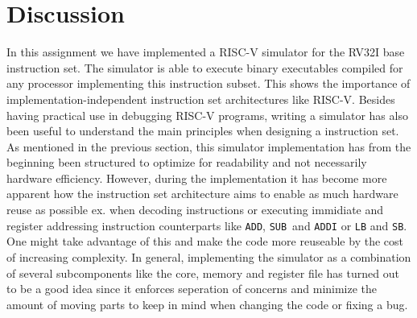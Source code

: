 \documentclass{article}
\begin{document}
\section{Discussion}
In this assignment we have implemented a RISC-V simulator for the RV32I base instruction set. The simulator is able to execute binary executables compiled for any processor implementing this instruction subset. This shows the importance of implementation-independent instruction set architectures like RISC-V. Besides having practical use in debugging RISC-V programs, writing a simulator has also been useful to understand the main principles when designing a instruction set. As mentioned in the previous section, this simulator implementation has from the beginning been structured to optimize for readability and not necessarily hardware efficiency. However, during the implementation it has become more apparent how the instruction set architecture aims to enable as much hardware reuse as possible ex. when decoding instructions or executing immidiate and register addressing instruction counterparts like \Verb|ADD|, \Verb|SUB| and \Verb|ADDI| or \Verb|LB| and \Verb|SB|. One might take advantage of this and make the code more reuseable by the cost of increasing complexity. In general, implementing the simulator as a combination of several subcomponents like the core, memory and register file has turned out to be a good idea since it enforces seperation of concerns and minimize the amount of moving parts to keep in mind when changing the code or fixing a bug.
\end{document}
